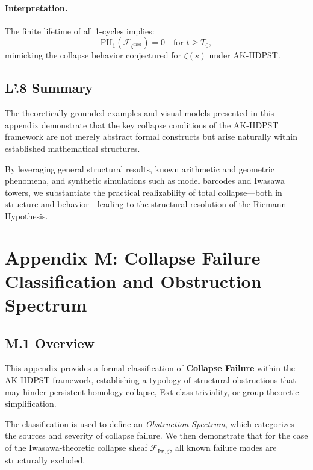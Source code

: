 \documentclass[11pt]{article}
\begin{document}
\paragraph{Interpretation.}  
The finite lifetime of all 1-cycles implies:
\[
\mathrm{PH}_1(\mathcal{F}_{\zeta^{\mathrm{mod}}}) = 0 \quad \text{for } t \geq T_0,
\]
mimicking the collapse behavior conjectured for $\zeta(s)$ under AK-HDPST.

\subsection*{L'.8 Summary}

The theoretically grounded examples and visual models presented in this appendix demonstrate that the key collapse conditions of the AK-HDPST framework are not merely abstract formal constructs but arise naturally within established mathematical structures.

By leveraging general structural results, known arithmetic and geometric phenomena, and synthetic simulations such as model barcodes and Iwasawa towers, we substantiate the practical realizability of total collapse—both in structure and behavior—leading to the structural resolution of the Riemann Hypothesis.




\section*{Appendix M: Collapse Failure Classification and Obstruction Spectrum}

\subsection*{M.1 Overview}

This appendix provides a formal classification of \textbf{Collapse Failure} within the AK-HDPST framework, establishing a typology of structural obstructions that may hinder persistent homology collapse, Ext-class triviality, or group-theoretic simplification.

The classification is used to define an \textit{Obstruction Spectrum}, which categorizes the sources and severity of collapse failure. We then demonstrate that for the case of the Iwasawa-theoretic collapse sheaf $\mathcal{F}_{\mathrm{Iw}, \zeta}$, all known failure modes are structurally excluded.
\end{document}
